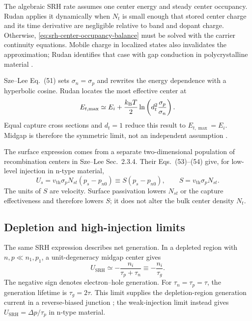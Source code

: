 The algebraic SRH rate assumes one center energy and steady center occupancy.
Rudan applies it dynamically when $N_t$ is small enough that stored center
charge and its time derivative are negligible relative to band and dopant
charge.  Otherwise, \cref{eq:srh-center-occupancy-balance} must be solved with
the carrier continuity equations.  Mobile charge in localized states also
invalidates the approximation; Rudan identifies that case with gap conduction
in polycrystalline material \cite[Sec.~20.2.3]{rudan2015}.

Sze--Lee Eq.~(51) sets $\sigma_n=\sigma_p$ and rewrites the energy dependence
with a hyperbolic cosine.  Rudan locates the most effective center at
\begin{equation}
  E_{t,\max}\simeq E_i
  +\frac{k_{\mathrm B} T}{2}\ln\left(d_t^2\frac{\sigma_p}{\sigma_n}\right).
  \label{eq:srh-optimum-center-energy}
\end{equation}
Equal capture cross sections and $d_t=1$ reduce this result to
$E_{t,\max}=E_i$.  Midgap is therefore the symmetric limit, not an independent
assumption \cite[Sec.~20.2.3, Eqs.~(20.25)--(20.30)]{rudan2015}.

The surface expression comes from a separate two-dimensional population of
recombination centers in Sze--Lee Sec.~2.3.4.  Their Eqs.~(53)--(54) give, for
low-level injection in n-type material,
\begin{equation}
  U_s=v_{\mathrm{th}}\sigma_pN_{st}(p_s-p_{n0})
  \equiv S(p_s-p_{n0}),
  \qquad
  S=v_{\mathrm{th}}\sigma_pN_{st}.
  \label{eq:surface-recombination-rate}
\end{equation}
The units of $S$ are velocity.  Surface passivation lowers $N_{st}$ or the
capture effectiveness and therefore lowers $S$; it does not alter the bulk
center density $N_t$.

\subsection{Depletion and high-injection limits}

The same SRH expression describes net generation.  In a depleted region with
$n,p\ll n_1,p_1$, a unit-degeneracy midgap center gives
\begin{equation}
  U_{\mathrm{SRH}}
  \simeq-\frac{n_i}{\tau_p+\tau_n}
  \equiv-\frac{n_i}{\tau_g}.
  \label{eq:srh-depletion-generation}
\end{equation}
The negative sign denotes electron--hole generation.  For
$\tau_n=\tau_p=\tau$, the generation lifetime is $\tau_g=2\tau$.  This limit
supplies the depletion-region generation current in a reverse-biased junction
\cite[Sec.~1.5.4]{szeNg2007}; the weak-injection limit instead gives
$U_{\mathrm{SRH}}=\Delta p/\tau_p$ in n-type material.

